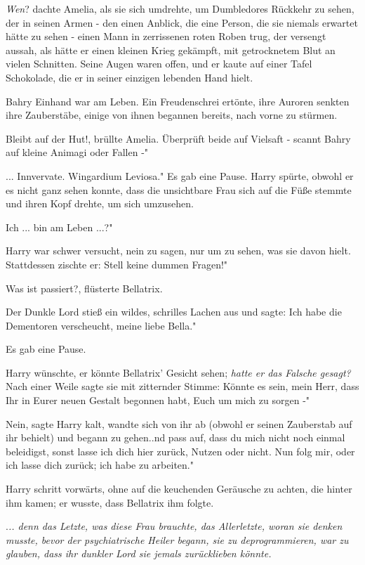 \emph{Wen}? dachte Amelia, als sie sich umdrehte, um Dumbledores Rückkehr zu
sehen, der in seinen Armen - den einen Anblick, die eine Person, die sie niemals
erwartet hätte zu sehen - einen Mann in zerrissenen roten Roben trug, der
versengt aussah, als hätte er einen kleinen Krieg gekämpft, mit getrocknetem
Blut an vielen Schnitten. Seine Augen waren offen, und er kaute auf einer Tafel
Schokolade, die er in seiner einzigen lebenden Hand hielt.

Bahry Einhand war am Leben. Ein Freudenschrei ertönte, ihre Auroren senkten ihre
Zauberstäbe, einige von ihnen begannen bereits, nach vorne zu stürmen.

\glqq Bleibt auf der Hut!\grqq{}, brüllte Amelia. \glqq Überprüft beide auf
Vielsaft - scannt Bahry auf kleine Animagi oder Fallen -"

... \glqq Innvervate. Wingardium Leviosa." Es gab eine Pause. Harry spürte,
obwohl er es nicht ganz sehen konnte, dass die unsichtbare Frau sich auf die
Füße stemmte und ihren Kopf drehte, um sich umzusehen.

\glqq Ich ... bin am Leben ...?"

Harry war schwer versucht, nein zu sagen, nur um zu sehen, was sie davon hielt.
Stattdessen zischte er: \glqq Stell keine dummen Fragen!"

\glqq Was ist passiert?\grqq{}, flüsterte Bellatrix.

Der Dunkle Lord stieß ein wildes, schrilles Lachen aus und sagte: \glqq Ich habe
die Dementoren verscheucht, meine liebe Bella."

Es gab eine Pause.

Harry wünschte, er könnte Bellatrix' Gesicht sehen; \emph{hatte er das Falsche
gesagt?} Nach einer Weile sagte sie mit zitternder Stimme: \glqq Könnte es sein,
mein Herr, dass Ihr in Eurer neuen Gestalt begonnen habt, Euch um mich zu sorgen
-"

\glqq Nein\grqq{}, sagte Harry kalt, wandte sich von ihr ab (obwohl er seinen
Zauberstab auf ihr behielt) und begann zu gehen.\grqq{}.nd pass auf, dass du
mich nicht noch einmal beleidigst, sonst lasse ich dich hier zurück, Nutzen oder
nicht. Nun folg mir, oder ich lasse dich zurück; ich habe zu arbeiten."

Harry schritt vorwärts, ohne auf die keuchenden Geräusche zu achten, die hinter
ihm kamen; er wusste, dass Bellatrix ihm folgte.

.\emph{.. denn das Letzte, was diese Frau brauchte, das Allerletzte, woran sie
denken musste, bevor der psychiatrische Heiler begann, sie zu deprogrammieren,
war zu glauben, dass ihr dunkler Lord sie jemals zurücklieben könnte.}

